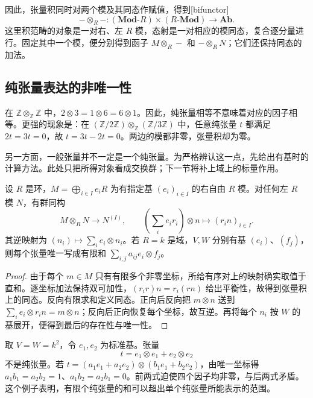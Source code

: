 因此，张量积同时对两个模及其同态作赋值，得到[bifunctor]
\[
	-\otimes_R-: (\mathbf{Mod}\text{-}R)\times(R\text{-}\mathbf{Mod}) \longrightarrow\mathbf{Ab}.
\]
这里积范畴的对象是一对右、左 \(R\) 模，态射是一对相应的模同态，复合逐分量进行。固定其中一个模，便分别得到函子 \(M\otimes_R-\) 和 \(-\otimes_RN\)；它们还保持同态的加法。

\subsection{纯张量表达的非唯一性}
\label{b2:subsec:0601:03}

在 \(\mathbb Z\otimes_{\mathbb Z}\mathbb Z\) 中，\(2\otimes3=1\otimes6=6\otimes1\)。因此，纯张量相等不意味着对应的因子相等。更强的现象是：在 \((\mathbb Z/2\mathbb Z)\otimes_{\mathbb Z}(\mathbb Z/3\mathbb Z)\) 中，任意纯张量 \(t\) 都满足 \(2t=3t=0\)，故 \(t=3t-2t=0\)。两边的模都非零，张量积却为零。

\ProseParagraphBreak
另一方面，一般张量并不一定是一个纯张量。为严格辨认这一点，先给出有基时的计算方法。此处只把所得对象看成交换群；下一节将补上域上的标量作用。

\begin{proposition}\label{b2:prop:tensor-free-coordinate}
	设 \(R\) 是环，\(M=\bigoplus_{i\in I}e_iR\) 为有指定基 \((e_i)_{i\in I}\) 的右自由 \(R\) 模。对任何左 \(R\) 模 \(N\)，有群同构
	\[
		M\otimes_RN\longrightarrow N^{(I)},\qquad \left(\sum_i e_i r_i\right)\otimes n\longmapsto(r_i n)_{i\in I}.
	\]
	其逆映射为 \((n_i)\mapsto\sum_i e_i\otimes n_i\)。若 \(R=k\) 是域，\(V,W\) 分别有基 \((e_i)\)、\((f_j)\)，则每个张量唯一写成有限和 \(\sum_{i,j}a_{ij}e_i\otimes f_j\)。
\end{proposition}
\begin{proof}
	由于每个 \(m\in M\) 只有有限多个非零坐标，所给有序对上的映射确实取值于直和。逐坐标加法保持双可加性，\((r_i r)n=r_i(rn)\) 给出平衡性，故得到张量积上的同态。反向有限求和定义同态。正向后反向把 \(m\otimes n\) 送到 \(\sum_i e_i\otimes r_i n=m\otimes n\)；反向后正向恢复每个坐标，故互逆。再将每个 \(n_i\) 按 \(W\) 的基展开，便得到最后的存在性与唯一性。
\end{proof}

取 \(V=W=k^2\)，令 \(e_1,e_2\) 为标准基。张量
\[
	t=e_1\otimes e_1+e_2\otimes e_2
\]
不是纯张量。若 \(t=(a_1e_1+a_2e_2)\otimes(b_1e_1+b_2e_2)\)，由唯一坐标得 \(a_1b_1=a_2b_2=1\)、\(a_1b_2=a_2b_1=0\)。前两式迫使四个因子均非零，与后两式矛盾。这个例子表明，有限个纯张量的和可以超出单个纯张量所能表示的范围。

